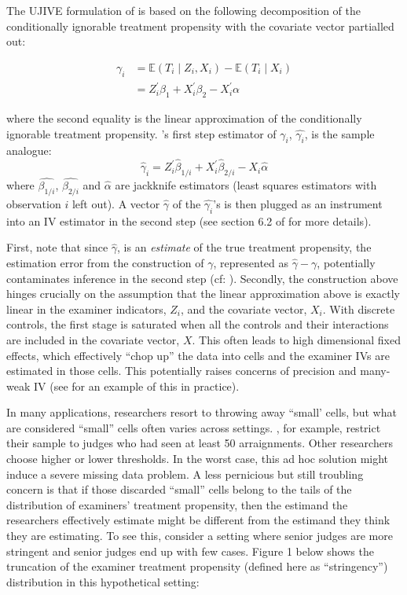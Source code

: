 The UJIVE formulation of \citet{kolesarcowles} is based on the following decomposition of the conditionally ignorable treatment propensity with the covariate vector partialled out:

\begin{align}
\gamma_i &= \mathbb{E}(T_i \mid Z_i, X_i) - \mathbb{E}(T_i \mid X_i) \\
&= Z_i^{\prime}\beta_1 + X_i^{\prime}\beta_2 - X_i^{\prime}\alpha \label{eq:diff}
\end{align}

where the second equality is the linear approximation of the conditionally ignorable treatment propensity. 
\citet{kolesarcowles}'s first step estimator of $\gamma_i$, $\hat{\gamma_i}$, is the sample analogue:
\[\hat{\gamma}_i=Z_i^{\prime}\hat{\beta}_{1/i}+X_i^{\prime}\hat{\beta}_{2/i}-X_i \hat{\alpha}
\]
where $\hat{\beta_{1/i}}$, $\hat{\beta_{2/i}}$ and $\hat{\alpha}$ are jackknife estimators (least squares estimators with observation $i$ left out). A vector $\hat{\gamma}$ of the $\hat{\gamma_i}$'s is then plugged as an instrument into an IV estimator in the second step (see section 6.2 of \citet{kolesarcowles} for more details).

First, note that since $\hat{\gamma}$, is an \textit{estimate} of the true treatment propensity, the estimation error from the construction of $\gamma$, represented as $\hat{\gamma}-\gamma$, potentially contaminates inference in the second step (cf: \citet{hahnridder2013}).  Secondly, the construction above hinges crucially on the assumption that the linear approximation above is exactly linear in the examiner indicators, $Z_i$, and the covariate vector, $X_i$. With discrete controls, the first stage is saturated when all the controls and their interactions are included in the covariate vector, $X$. This often leads to high dimensional fixed effects, which effectively \enquote{chop up} the data into cells and the examiner IVs are estimated in those cells. This potentially raises concerns of precision and many-weak IV (see \citet{bhuller} for an example of this in practice). 

In many applications, researchers resort to throwing away ``small' cells, but what are considered ``small'' cells often varies across settings. \citet{frandsen2023judging}, for example, restrict their sample to judges who had seen at least 50 arraignments. Other researchers choose higher or lower thresholds. In the worst case, this ad hoc solution might induce a severe missing data problem. A less pernicious but still troubling concern is that if those discarded ``small'' cells  belong to the tails of the distribution of examiners' treatment propensity, then the estimand the researchers effectively estimate might be different from the estimand they think they are estimating. To see this, consider a setting where senior judges are more stringent and senior judges end up with few cases. Figure 1 below shows the truncation of the examiner treatment propensity (defined here as ``stringency'') distribution in this hypothetical setting:

